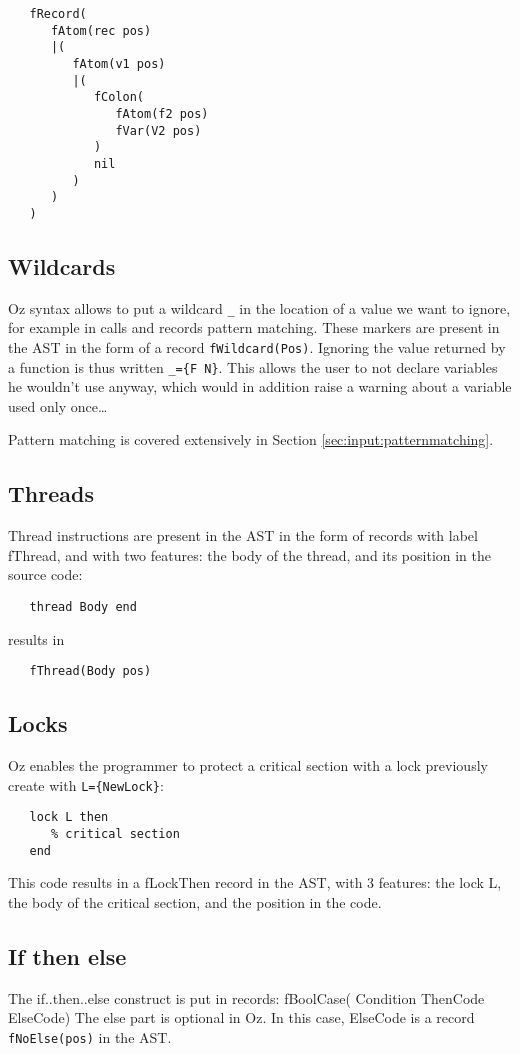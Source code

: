 \documentclass[a4paper]{memoir}
\begin{document}
\begin{lstlisting}
   fRecord(
      fAtom(rec pos)
      |(
         fAtom(v1 pos)
         |(
            fColon(
               fAtom(f2 pos)
               fVar(V2 pos)
            )
            nil
         )
      )
   )
\end{lstlisting}


\subsection{Wildcards}\label{sec:input:wildcard}
Oz syntax allows to put a wildcard \lstinline!_! in the location of a value we want to ignore, for example in calls and records pattern matching. These markers are present in the AST in the form of a record \lstinline!fWildcard(Pos)!.
Ignoring the value returned by a function is thus written \lstinline!_={F N}!. 
This allows the user to not declare variables he wouldn't use anyway, which would in addition raise a warning about a variable used only once\ldots

Pattern matching is covered extensively in Section \ref{sec:input:patternmatching}.

\subsection{Threads}
Thread instructions are present in the AST in the form of records with label fThread, and with two features: the body of the thread, and its position in the source code:
\begin{lstlisting}
   thread Body end
\end{lstlisting}
results in
\begin{lstlisting}
   fThread(Body pos)
\end{lstlisting}
\subsection{Locks}
Oz enables the programmer to protect a critical section with a lock previously create with \lstinline!L={NewLock}!:
\begin{lstlisting}
   lock L then
      % critical section
   end
\end{lstlisting}

This code results in a fLockThen record in the AST, with 3 features: the lock L, the body of the critical section, and the position in the code.
\subsection{If then else}
The if..then..else construct is put in records:
fBoolCase( Condition ThenCode ElseCode)
The else part is optional in Oz. In this case, ElseCode is a record \lstinline!fNoElse(pos)! in the AST.
\end{document}
